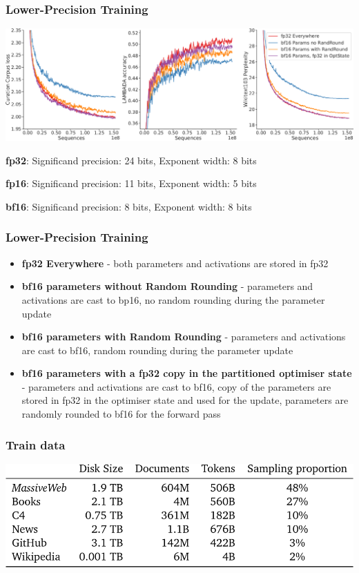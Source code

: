 \documentclass{beamer}
\begin{document}
\begin{frame}
    \frametitle{Lower-Precision Training}
    \begin{center}
        \includegraphics[scale=1.1]{img/fp16.png}
    \end{center}
    \begin{itemize}
        \tiny{\item \textbf{fp32}: Significand precision: 24 bits, Exponent width: 8 bits}
        \tiny{\item \textbf{fp16}: Significand precision: 11 bits, Exponent width: 5 bits}
        \tiny{\item \textbf{bf16}: Significand precision: 8 bits, Exponent width: 8 bits}
    \end{itemize}
\end{frame}

\begin{frame}
    \frametitle{Lower-Precision Training}
    \begin{itemize}
        \item \textbf{fp32 Everywhere} - both parameters and activations are stored in fp32
        \item \textbf{bf16 parameters without Random Rounding} - parameters and activations are cast to bp16, no random rounding during the parameter update
        \item \textbf{bf16 parameters with Random Rounding} - parameters and activations are cast to bf16, random rounding during the parameter update
        \item \textbf{bf16 parameters with a fp32 copy in the partitioned optimiser state} - parameters and activations are cast to bf16, copy of the parameters are stored in
fp32 in the optimiser state and used for the update, parameters are randomly rounded to bf16 for the forward pass
    \end{itemize}
\end{frame}

\begin{frame}
    \frametitle{Train data}
    \begin{center}
        \includegraphics[scale=1.5]{img/gopher_train_data.png}
    \end{center}
\end{frame}
\end{document}
